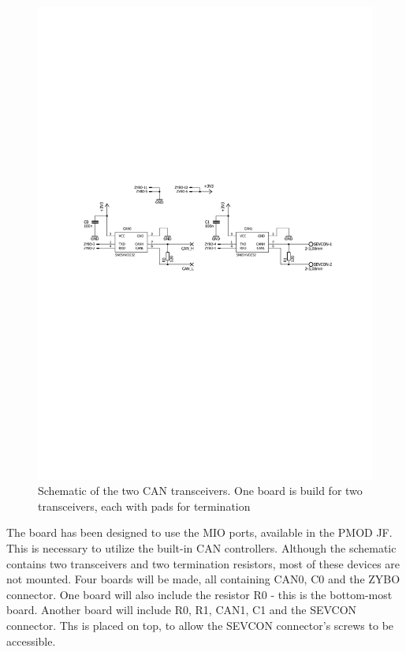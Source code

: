 \begin{figure}[h!]
	\centering
	\includegraphics[width = \linewidth]{graphics/CAN_Schematic}
	\caption{Schematic of the two CAN transceivers. One board is build for two transceivers, each with pads for termination}
	\label{fig:CAN_Schematic}
\end{figure}

The board has been designed to use the MIO ports, available in the PMOD JF. 
This is necessary to utilize the built-in CAN controllers.
Although the schematic contains two transceivers and two termination resistors, most of these devices are not mounted. 
Four boards will be made, all containing CAN0, C0 and the ZYBO connector. 
One board will also include the resistor R0 - this is the bottom-most board.
Another board will include R0, R1, CAN1, C1 and the SEVCON connector.
Ths is placed on top, to allow the SEVCON connector's screws to be accessible. 

